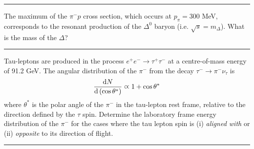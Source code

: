 \noindent\rule{7in}{1.5pt}


\begin{problem}{2.10}
The maximum of the $\pi^-p$ cross section, which occurs at $p_\pi=300$ MeV, corresponds to the resonant production of the $\Delta^0$ baryon (i.e. $\sqrt{s}=m_\Delta$). What is the mass of the $\Delta$?
\end{problem}
\begin{solution}
        
\end{solution} 

\noindent\rule{7in}{1.5pt}


\begin{problem}{2.11}
   Tau-leptons are produced in the process $e^+e^-\to\tau^+\tau^-$ at a centre-of-mass energy of 91.2 GeV. The angular distribution of the $\pi^-$ from the decay $\tau^-\to\pi^-\nu_\tau$ is 
   \begin{align*}
        \frac{\mathop{}\!\mathrm{d} N}{ \mathop{}\!\mathrm{d} \left(\cos\theta^\ast\right)} \varpropto 1 + \cos\theta^\ast
   \end{align*} 
   where $\theta^\ast$ is the polar angle of the $\pi^-$ in the tau-lepton rest frame, relative to the direction defined by the $\tau$ spin. Determine the laboratory frame energy distribution of the $\pi^-$ for the cases where the tau lepton spin is (i) \textit{aligned with} or (ii) \textit{opposite} to its direction of flight.
\end{problem}
\begin{solution}
            
\end{solution} 
    
\noindent\rule{7in}{1.5pt}




